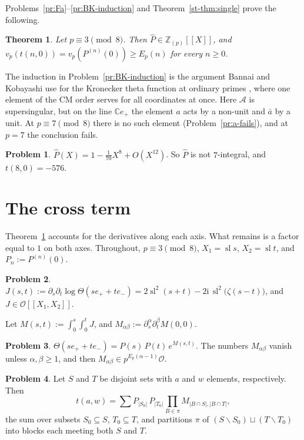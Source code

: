 \documentclass[reqno]{amsart}
\theoremstyle{definition}
\newtheorem{problem}{Problem}[section]
\theoremstyle{plain}
\newtheorem{theorem}{Theorem}[section]
\newcommand{\Z}{\mathbb{Z}}
\newcommand{\C}{\mathbb{C}}
\newcommand{\ii}{\mathrm{i}}
\newcommand{\Oc}{\mathcal{O}}
\newcommand{\sll}{\operatorname{sl}}
\begin{document}
Problems~\ref{pr:Fa}--\ref{pr:BK-induction} and Theorem~\ref{st-thm:single} prove the following.

\begin{theorem}\label{thm:line}
Let \(p \equiv 3 \pmod 8\).  Then \(\hat P \in \Z_{(p)}[[X]]\), and \(v_p(t(n, 0)) = v_p(P^{(n)}(0)) \ge E_p(n)\) for every \(n \ge 0\).
\end{theorem}

The induction in Problem~\ref{pr:BK-induction} is the argument Bannai and Kobayashi use for the Kronecker theta function at ordinary primes \cite[Prop.~2.14]{BK}, where one element of the CM order serves for all coordinates at once.  Here \(\mathcal{A}\) is supersingular, but on the line \(\C e_+\) the element \(a\) acts by a non-unit and \(\bar a\) by a unit.  At \(p \equiv 7 \pmod 8\) there is no such element (Problem~\ref{pr:a-fails}), and at \(p = 7\) the conclusion fails.

\begin{problem}\label{pr:p7}
\(\hat P(X) = 1 - \tfrac{1}{70}X^8 + O(X^{12})\).  So \(\hat P\) is not \(7\)-integral, and \(t(8,0) = -576\).
\end{problem}

\section{The cross term}\label{sec:cross}

Theorem~\ref{thm:line} accounts for the derivatives along each axis.  What remains is a factor equal to \(1\) on both axes.  Throughout, \(p \equiv 3 \pmod 8\), \(X_1 = \sll s\), \(X_2 = \sll t\), and \(P_n := P^{(n)}(0)\).

\begin{problem}\label{pr:J}
\(J(s,t) := \partial_s\partial_t \log\Theta(s e_+ + t e_-) = 2\sll^2(s + t) - 2\ii\, \sll^2\bigl(\zeta(s - t)\bigr)\), and \(J \in \Oc[[X_1, X_2]]\).
\end{problem}

Let \(M(s,t) := \int_0^s \int_0^t J\), and \(M_{\alpha\beta} := \partial_s^\alpha \partial_t^\beta M(0,0)\).

\begin{problem}\label{pr:factor}
\(\Theta(s e_+ + t e_-) = P(s)\, P(t)\, e^{M(s,t)}\).  The numbers \(M_{\alpha\beta}\) vanish unless \(\alpha, \beta \ge 1\), and then \(M_{\alpha\beta} \in p^{E_p(\alpha - 1)}\Oc\).
\end{problem}

\begin{problem}\label{pr:expformula}
Let \(S\) and \(T\) be disjoint sets with \(a\) and \(w\) elements, respectively.  Then
\[
  t(a,w) = \sum P_{\lvert S_0 \rvert}\, P_{\lvert T_0 \rvert} \prod_{B \in \pi} M_{\lvert B \cap S \rvert, \lvert B \cap T \rvert},
\]
the sum over subsets \(S_0 \subseteq S\), \(T_0 \subseteq T\), and partitions \(\pi\) of \((S \smallsetminus S_0) \sqcup (T \smallsetminus T_0)\) into blocks each meeting both \(S\) and \(T\).
\end{problem}
\end{document}
